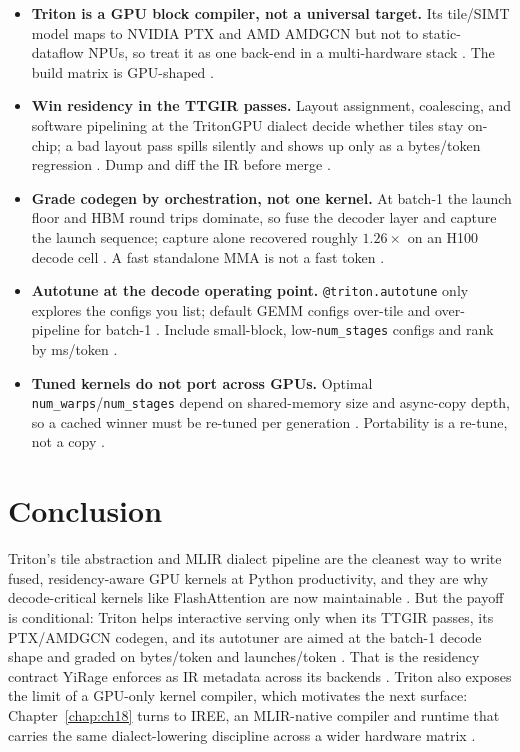 \begin{itemize}
\item \textbf{Triton is a GPU block compiler, not a universal target.}
Its tile/SIMT model maps to NVIDIA PTX and AMD AMDGCN but not to static-dataflow NPUs, so treat it as one back-end in a multi-hardware stack \citep{tillet2019triton,tritonlang2024}. The build matrix is GPU-shaped \citep{amd2024xdna}.

\item \textbf{Win residency in the TTGIR passes.}
Layout assignment, coalescing, and software pipelining at the TritonGPU dialect decide whether tiles stay on-chip; a bad layout pass spills silently and shows up only as a bytes/token regression \citep{tritonlang2024,memoryfloor2026}. Dump and diff the IR before merge \citep{taxbreak2026}.

\item \textbf{Grade codegen by orchestration, not one kernel.}
At batch-1 the launch floor and HBM round trips dominate, so fuse the decoder layer and capture the launch sequence; capture alone recovered roughly $1.26\times$ on an H100 decode cell \citep{memoryfloor2026,nvidia2024cudagraphs}. A fast standalone MMA is not a fast token \citep{dao2022flashattention}.

\item \textbf{Autotune at the decode operating point.}
\texttt{@triton.autotune} only explores the configs you list; default GEMM configs over-tile and over-pipeline for batch-1 \citep{tritonlang2024,kwon2023vllm}. Include small-block, low-\texttt{num\_stages} configs and rank by ms/token \citep{patel2025llminference}.

\item \textbf{Tuned kernels do not port across GPUs.}
Optimal \texttt{num\_warps}/\texttt{num\_stages} depend on shared-memory size and async-copy depth, so a cached winner must be re-tuned per generation \citep{nvidia2022hopper,semianalysis2024tma}. Portability is a re-tune, not a copy \citep{dlbook}.
\end{itemize}

\section{Conclusion}
\label{sec:ch17_conclusion}

Triton's tile abstraction and MLIR dialect pipeline are the cleanest way to write fused, residency-aware GPU kernels at Python productivity, and they are why decode-critical kernels like FlashAttention are now maintainable \citep{tillet2019triton,dao2022flashattention}. But the payoff is conditional: Triton helps interactive serving only when its TTGIR passes, its PTX/AMDGCN codegen, and its autotuner are aimed at the batch-1 decode shape and graded on bytes/token and launches/token \citep{taxbreak2026,memoryfloor2026}. That is the residency contract YiRage enforces as IR metadata across its backends \citep{yirage2026}. Triton also exposes the limit of a GPU-only kernel compiler, which motivates the next surface: Chapter~\ref{chap:ch18} turns to IREE, an MLIR-native compiler and runtime that carries the same dialect-lowering discipline across a wider hardware matrix \citep{dlbook}.


